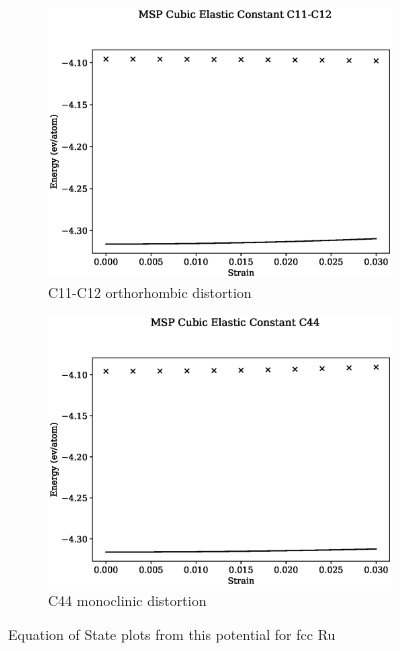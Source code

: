 \begin{figure}[htb]
\begin{subfigure}{.42\textwidth}
  \centering
  \includegraphics[width=.90\linewidth]{chapters/potentials_fe_pd_ru/feru_potential/ec_mskp/msp_c11_c12_plot_bp_0.eps}  
  \caption{C11-C12 orthorhombic distortion}
  \label{fig:fepd-fefcc-rose}
\end{subfigure}
\begin{subfigure}{.42\textwidth}
  \centering
  \includegraphics[width=.90\linewidth]{chapters/potentials_fe_pd_ru/feru_potential/ec_mskp/msp_c44_plot_bp_0.eps}  
  \caption{C44 monoclinic distortion}
  \label{fig:fepd-fefcc-bmeos}
\end{subfigure}
\label{fig:fefcc-equation-of-state}
\caption{Equation of State plots from this potential for \acrshort{fcc} Ru}
\end{figure}







